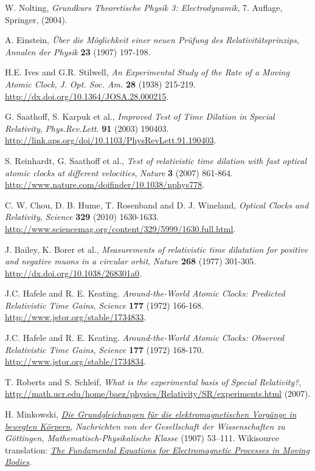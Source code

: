 \begin{thebibliography}{99}
 W. Nolting, {\it Grundkurs Theoretische Physik 3: Electrodynamik}, 7. Auflage, Springer, (2004).

 A. Einstein, {\it \"Uber die M\"oglichkeit einer neuen Pr\"ufung des Relativit\"atsprinzips}, {\sl Annalen der Physik} {\bf 23} (1907) 197-198.

 H.E. Ives and G.R. Stilwell, {\it An Experimental Study of the Rate of a Moving Atomic Clock}, {\sl J. Opt. Soc. Am.} {\bf 28} (1938) 215-219. \url{http://dx.doi.org/10.1364/JOSA.28.000215}.

 G. Saathoff, S. Karpuk et al., {\it Improved Test of Time Dilation in Special Relativity}, {\sl Phys.Rev.Lett.} {\bf 91} (2003) 190403. \url{http://link.aps.org/doi/10.1103/PhysRevLett.91.190403}.

 S. Reinhardt, G. Saathoff et al., {\it Test of relativistic time dilation with fast optical atomic clocks at different velocities}, {\sl Nature} {\bf 3} (2007) 861-864. \url{http://www.nature.com/doifinder/10.1038/nphys778}.

 C. W. Chou, D. B. Hume, T. Rosenband and D. J. Wineland, {\em Optical Clocks and Relativity}, {\sl Science} {\bf 329} (2010) 1630-1633. \url{http://www.sciencemag.org/content/329/5999/1630.full.html}.

 J. Bailey, K. Borer et al., {\it Measurements of relativistic time dilatation for positive and negative muons in a circular orbit}, {\sl Nature} {\bf 268} (1977) 301-305. \url{http://dx.doi.org/10.1038/268301a0}.

 J.C. Hafele and R. E. Keating. {\it Around-the-World Atomic Clocks: Predicted Relativistic Time Gains}, {\sl Science} {\bf 177} (1972) 166-168. \url{http://www.jstor.org/stable/1734833}.

 J.C. Hafele and R. E. Keating. {\it Around-the-World Atomic Clocks: Observed Relativistic Time Gains}, {\sl Science} {\bf 177} (1972) 168-170. \url{http://www.jstor.org/stable/1734834}.

 T. Roberts and S. Schleif, {\it What is the experimental basis of Special Relativity?},  \url{http://math.ucr.edu/home/baez/physics/Relativity/SR/experiments.html} (2007).

 H. Minkowski, \href{http://de.wikisource.org/wiki/Die_Grundgleichungen_f\%C3\%BCr_die_elektromagnetischen_Vorg\%C3\%A4nge_in_bewegten_K\%C3\%B6rpern}{\it Die Grundgleichungen f\"ur die elektromagnetischen Vorg\"ange in bewegten K\"orpern}, {\sl Nachrichten von der Gesellschaft der Wissenschaften zu Göttingen, Mathematisch-Physikalische Klasse} (1907) 53–111. Wikisource translation: \href{http://en.wikisource.org/wiki/The_Fundamental_Equations_for_Electromagnetic_Processes_in_Moving_Bodies}{\it The Fundamental Equations for Electromagnetic Processes in Moving Bodies}.


\end{thebibliography}
